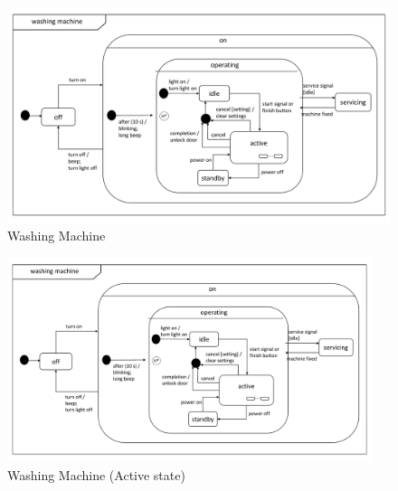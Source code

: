 \documentclass[12pt]{article}
\begin{document}
\begin{spacing}{1.5}
\begin{figure}[h!]
	\centering
		\includegraphics[page=1,width=1\textwidth]{./figures/updatedSecondDraft.pdf}
		  \caption{Washing Machine}
  \label{fig:wm-fig1}
\end{figure}

\begin{figure}[h!]
	\centering
		\includegraphics[page=2,width=0.95\textwidth]{./figures/updatedSecondDraft.pdf}
		  \caption{Washing Machine (Active state) }
  \label{fig:wm-fig2}
\end{figure}

\end{spacing}
\end{document}
